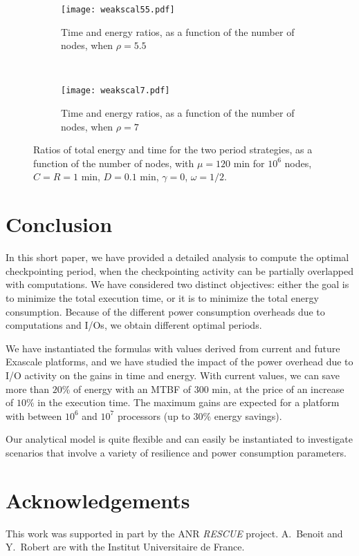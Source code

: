 \documentclass[a4paper]{article}
\newcommand{\workduringckpt}{\omega}
\newcommand{\dos}{\gamma}
\newcommand{\ratio}{\rho}
\begin{document}
\begin{figure}
    \centering
  \begin{subfigure}[b]{0.7\textwidth}
    \centering
    \texttt{[image: weakscal55.pdf]}
    \caption{Time and energy ratios, as a function of the
      number of nodes, when $\ratio = 5.5$}\label{fig:weak55}
  \end{subfigure}\\
  \begin{subfigure}[b]{0.7\textwidth}
    \centering
    \texttt{[image: weakscal7.pdf]}
    \caption{Time and energy ratios, as a function of the
      number of nodes, when $\ratio = 7$}\label{fig:weak7}
  \end{subfigure}  
  \caption{Ratios of total energy and time for the two period strategies, as a function of the
      number of nodes, with $\mu = 120$ min 
      for $10^6$ nodes, $C=R=1$ min, $D=0.1$ min, $\dos=0$, $\workduringckpt=1/2$.\label{fig3}}
\end{figure}

\section{Conclusion}
\label{sec.conclusion}

In this short paper, we have provided a detailed analysis to compute the 
optimal checkpointing period, when the checkpointing activity can be partially
overlapped with computations. We have considered two distinct objectives:
either the goal is to minimize the total execution time, or it is to minimize
the total energy consumption. Because of the different power consumption overheads
due to computations and I/Os, we obtain different optimal periods. 

We have instantiated the formulas with values derived from current and future
Exascale platforms, and we have studied the impact of the power overhead
due to I/O activity on the gains in time and energy. With current values, we can save
more than $20\%$ of energy with an MTBF of 300 min, at the price of an increase of 
$10\%$ in the execution time. The maximum gains are expected for a platform
with between $10^6$ and $10^7$ processors (up to $30\%$ energy savings). 

Our analytical model is quite flexible and can easily be instantiated to investigate scenarios
that involve a variety of resilience and power consumption parameters.

\section*{Acknowledgements} 

This work was supported in part by the ANR {\em RESCUE} project. 
A.~Benoit and Y.~Robert are with the Institut Universitaire de France.

\clearpage


\end{document}

